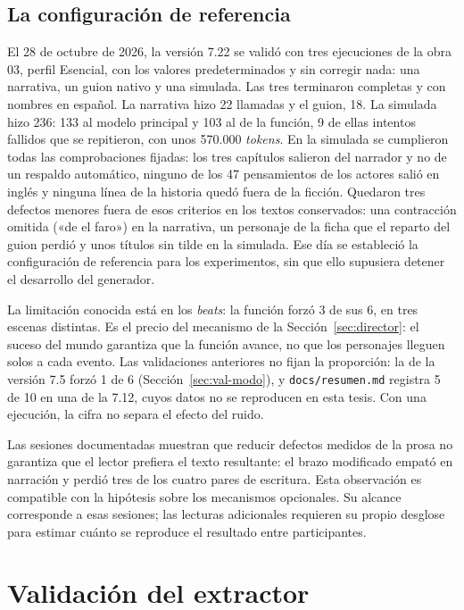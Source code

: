 \subsection{La configuración de referencia}\label{sec:val-congelada}

El 28 de octubre de 2026, la versión 7.22 se validó con tres ejecuciones de la obra 03, perfil
Esencial, con los valores predeterminados y sin corregir nada: una narrativa, un guion nativo y una
simulada. Las tres terminaron completas y con nombres en español. La narrativa hizo 22 llamadas y el guion, 18. La simulada hizo 236:
133 al modelo principal y 103 al de la función, 9 de ellas intentos fallidos que se repitieron, con
unos 570.000 \textit{tokens}. En la simulada se cumplieron todas las comprobaciones fijadas: los tres
capítulos salieron del narrador y no de un respaldo automático, ninguno de los 47 pensamientos de los
actores salió en inglés y ninguna línea de la historia quedó fuera de la ficción. Quedaron tres
defectos menores fuera de esos criterios en los textos conservados: una contracción omitida
(«de el faro») en la narrativa, un personaje de la ficha que el reparto del guion perdió y unos
títulos sin tilde en la simulada. Ese día se estableció la configuración de referencia para los experimentos, sin que ello
supusiera detener el desarrollo del generador.

La limitación conocida está en los \textit{beats}: la función forzó 3 de sus 6, en tres escenas
distintas. Es el precio del mecanismo de la Sección~\ref{sec:director}: el suceso del mundo garantiza
que la función avance, no que los personajes lleguen solos a cada evento. Las validaciones anteriores
no fijan la proporción: la de la versión 7.5 forzó 1 de 6 (Sección~\ref{sec:val-modo}), y
\texttt{docs/resumen.md} registra 5 de 10 en una de la 7.12, cuyos datos no se reproducen en esta
tesis. Con una ejecución, la cifra no separa el efecto del ruido.

Las sesiones documentadas muestran que reducir defectos medidos de la prosa no garantiza que el
lector prefiera el texto resultante: el brazo modificado empató en narración y perdió tres de los
cuatro pares de escritura. Esta observación es compatible con la hipótesis sobre los mecanismos
opcionales. Su alcance corresponde a esas sesiones; las lecturas adicionales requieren su propio
desglose para estimar cuánto se reproduce el resultado entre participantes.

\section{Validación del extractor}\label{sec:resultados-extractor}

